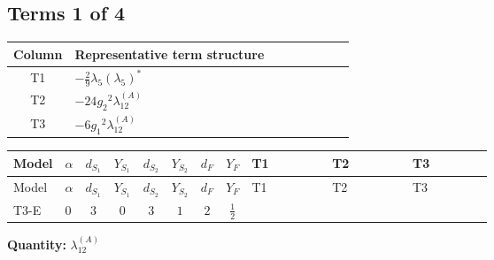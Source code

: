 \documentclass[8pt]{article}
\begin{document}
\begin{landscape}
\subsection*{Terms 1 of 4}
\begin{center}
\begin{tabular}{@{}c >{\raggedright\arraybackslash}p{0.82\linewidth}@{}}
\toprule
Column & Representative term structure \\
\midrule
T1 & \(\displaystyle -\frac{2}{9} {\lambda_5} \left({\lambda_5}\right)^{*}\) \\
\midrule
T2 & \(\displaystyle -24 {g_2}^2 {\lambda_{12}^{(A)}}\) \\
\midrule
T3 & \(\displaystyle -6 {g_1}^2 {\lambda_{12}^{(A)}}\) \\
\midrule
\bottomrule
\end{tabular}
\end{center}
\smallskip
\tiny
\begin{longtable}{@{}llcccccc >{\raggedright\arraybackslash}p{0.21\linewidth} >{\raggedright\arraybackslash}p{0.21\linewidth} >{\raggedright\arraybackslash}p{0.21\linewidth}@{}}
\toprule
Model & $\alpha$ & $d_{S_1}$ & $Y_{S_1}$ & $d_{S_2}$ & $Y_{S_2}$ & $d_F$ & $Y_F$ & T1 & T2 & T3 \\
\midrule
\endfirsthead
\toprule
Model & $\alpha$ & $d_{S_1}$ & $Y_{S_1}$ & $d_{S_2}$ & $Y_{S_2}$ & $d_F$ & $Y_F$ & T1 & T2 & T3 \\
\midrule
\endhead
T3-E & $0$ & $3$ & $0$ & $3$ & $1$ & $2$ & $\frac{1}{2}$ & \scriptsize\adjustbox{max width=\linewidth}{$\begin{gathered} -\frac{2}{9} {\lambda_5} \left({\lambda_5}\right)^{*}\end{gathered}$} & \scriptsize\adjustbox{max width=\linewidth}{$\begin{gathered} -24 {g_2}^2 {\lambda_{12}^{(A)}}\end{gathered}$} & \scriptsize\adjustbox{max width=\linewidth}{$\begin{gathered} -6 {g_1}^2 {\lambda_{12}^{(A)}}\end{gathered}$} \\
\midrule
\bottomrule
\end{longtable}
\clearpage
\noindent\textbf{Quantity: }$\lambda_{12}^{(A)}$\par\smallskip

\end{landscape}
\end{document}
